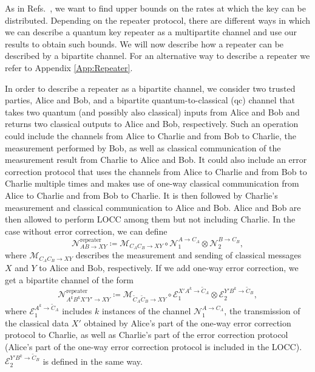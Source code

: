 \documentclass[aps,pra,twocolumn,superscriptaddress,longbibliography]{revtex4-1}
\newcommand{\mc}[1]{\mathcal{#1}}
\begin{document}
As in Refs.~\cite{bauml2015limitations,CM17,christandl2017private}, we want to find upper bounds on the rates at which the key can be distributed. Depending on the repeater protocol, there are different ways in which we can describe a quantum key repeater as a multipartite channel and use our results to obtain such bounds. We will now describe how a repeater can be described by a bipartite channel. For an alternative way to describe a repeater we refer to Appendix \ref{App:Repeater}.

In order to describe a repeater as a bipartite channel, we consider two trusted parties, Alice and Bob, and a bipartite quantum-to-classical (qc) channel that takes two quantum (and possibly also classical) inputs from Alice and Bob and returns two classical outputs to Alice and Bob, respectively. Such an operation could include the channels from Alice to Charlie and from Bob to Charlie, the measurement performed by Bob, as well as classical communication of the measurement result from Charlie to Alice and Bob. It could also include an error correction protocol that uses the channels from Alice to Charlie and from Bob to Charlie multiple times and makes use of one-way classical communication from Alice to Charlie and from Bob to Charlie. It is then followed by Charlie's measurement and classical communication to Alice and Bob. Alice and Bob are then allowed to perform LOCC among them but not including Charlie. In the case without error correction, we can define
\begin{equation}
{\mc N}_{AB\to XY}^{\text{repeater}}\coloneqq {\mc M}_{C_AC_B\to  XY}\circ {\mc N}_1^{A\to C_A}\otimes{\mc N}_2^{B\to C_B},
\end{equation}
where ${\mc M}_{C_AC_B\to XY}$ describes the measurement and sending of classical messages $X$ and $Y$ to Alice and Bob, respectively. If we add one-way error correction, we get a bipartite channel of the form
\begin{equation}
{\mc N}_{A^kB^kX'Y'\to XY}^{\text{repeater}}\coloneqq {\mc M}_{\tilde{C}_A\tilde{C}_B\to  XY}\circ {\mc E}_1^{X'A^k\to \tilde{C}_A}\otimes{\mc E}_2^{Y'B^k\to \tilde{C}_B},
\end{equation}
where ${\mc E}_1^{A^k\to \tilde{C}_A}$ includes $k$ instances of the channel $ {\mc N}_1^{A\to C_A}$, the transmission of the classical data $X'$ obtained by Alice's part of the one-way error correction protocol to Charlie, as well as Charlie's part of the error correction protocol (Alice's part of the one-way error correction protocol is included in the LOCC). ${\mc E}_2^{Y'B^k\to \tilde{C}_B}$ is defined in the same way.
\end{document}
